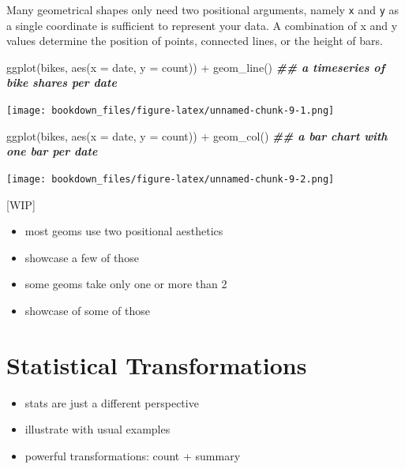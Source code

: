 \documentclass[
]{krantz}
\makeatletter
\newenvironment{Shaded}{\begin{snugshade}}{\end{snugshade}}
\newcommand{\AttributeTok}[1]{\textcolor[rgb]{0.61,0.61,0.61}{#1}}
\newcommand{\DocumentationTok}[1]{\textcolor[rgb]{0.37,0.37,0.37}{\textbf{\textit{#1}}}}
\newcommand{\FunctionTok}[1]{\textcolor[rgb]{0,0,0}{#1}}
\newcommand{\NormalTok}[1]{#1}
\newcommand{\SpecialCharTok}[1]{\textcolor[rgb]{0,0,0}{#1}}
\providecommand{\tightlist}{%
  \setlength{\itemsep}{0pt}\setlength{\parskip}{0pt}}
\newenvironment{kframe}{%
\medskip{}
\setlength{\fboxsep}{.8em}
 \def\at@end@of@kframe{}%
 \ifinner\ifhmode%
  \def\at@end@of@kframe{\end{minipage}}%
  \begin{minipage}{\columnwidth}%
 \fi\fi%
 \def\FrameCommand##1{\hskip\@totalleftmargin \hskip-\fboxsep
 \colorbox{shadecolor}{##1}\hskip-\fboxsep
     \hskip-\linewidth \hskip-\@totalleftmargin \hskip\columnwidth}%
 \MakeFramed {\advance\hsize-\width
   \@totalleftmargin\z@ \linewidth\hsize
   \@setminipage}}%
 {\par\unskip\endMakeFramed%
 \at@end@of@kframe}
\renewenvironment{Shaded}{\begin{kframe}}{\end{kframe}}
\makeatother
\begin{document}
Many geometrical shapes only need two positional arguments, namely \texttt{x} and \texttt{y} as a single coordinate is sufficient to represent your data. A combination of x and y values determine the position of points, connected lines, or the height of bars.

\begin{Shaded}
\begin{Highlighting}[]
\FunctionTok{ggplot}\NormalTok{(bikes, }\FunctionTok{aes}\NormalTok{(}\AttributeTok{x =}\NormalTok{ date, }\AttributeTok{y =}\NormalTok{ count)) }\SpecialCharTok{+}
  \FunctionTok{geom\_line}\NormalTok{() }\DocumentationTok{\#\# a timeseries of bike shares per date}
\end{Highlighting}
\end{Shaded}

\texttt{[image: bookdown\_files/figure-latex/unnamed-chunk-9-1.png]}

\begin{Shaded}
\begin{Highlighting}[]
\FunctionTok{ggplot}\NormalTok{(bikes, }\FunctionTok{aes}\NormalTok{(}\AttributeTok{x =}\NormalTok{ date, }\AttributeTok{y =}\NormalTok{ count)) }\SpecialCharTok{+}
  \FunctionTok{geom\_col}\NormalTok{() }\DocumentationTok{\#\# a bar chart with one bar per date}
\end{Highlighting}
\end{Shaded}

\texttt{[image: bookdown\_files/figure-latex/unnamed-chunk-9-2.png]}

{[}WIP{]}

\begin{itemize}
\tightlist
\item
  most geoms use two positional aesthetics
\item
  showcase a few of those
\item
  some geoms take only one or more than 2
\item
  showcase of some of those
\end{itemize}

\hypertarget{statistical-transformations}{%
\section{Statistical Transformations}\label{statistical-transformations}}

\begin{itemize}
\tightlist
\item
  stats are just a different perspective
\item
  illustrate with usual examples
\item
  powerful transformations: count + summary
\end{itemize}
\end{document}
